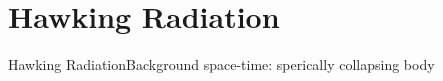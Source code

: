 \documentclass{beamer}
\begin{document}

\section{Hawking Radiation}

\begin{frame}{Hawking Radiation}{Background space-time: sperically collapsing body}
\begin{center}

\end{center}
\end{frame}
\end{document}
